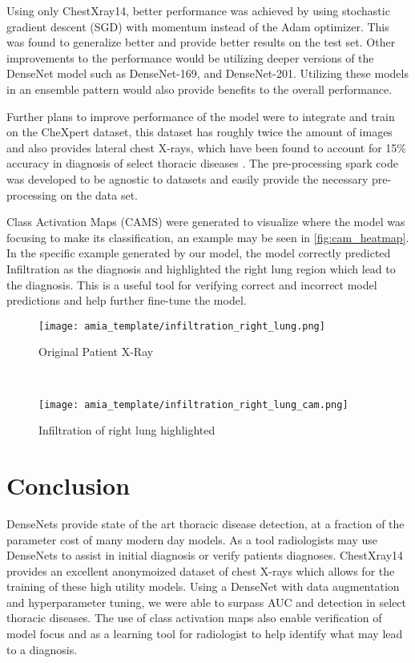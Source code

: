 \documentclass{amia}
\begin{document}
Using only ChestXray14, better performance was achieved by using stochastic gradient descent (SGD) with momentum instead of the Adam optimizer. This was found to generalize better \cite{ref13} and provide better results on the test set. Other improvements to the performance would be utilizing deeper versions of the DenseNet model such as DenseNet-169, and DenseNet-201. Utilizing these models in an ensemble pattern would also provide benefits to the overall performance.

Further plans to improve performance of the model were to integrate and train on the CheXpert dataset, this dataset has roughly twice the amount of images and also provides lateral chest X-rays, which have been found to account for 15\% accuracy in diagnosis of select thoracic diseases \cite{ref2}. The pre-processing spark code was developed to be agnostic to datasets and easily provide the necessary pre-processing on the data set.

Class Activation Maps (CAMS) were generated to visualize where the model was focusing to make its classification, an example may be seen in \ref{fig:cam_heatmap}. In the specific example generated by our model, the model correctly predicted Infiltration as the diagnosis and highlighted the right lung region which lead to the diagnosis. This is a useful tool for verifying correct and incorrect model predictions and help further fine-tune the model.

\begin{figure*}[t!]
    \centering
    \begin{subfigure}[t]{0.5\textwidth}
        \centering
        \texttt{[image: amia\_template/infiltration\_right\_lung.png]}
        \caption{Original Patient X-Ray}
    \end{subfigure}%
    ~
    \begin{subfigure}[t]{0.5\textwidth}
        \centering
        \texttt{[image: amia\_template/infiltration\_right\_lung\_cam.png]}
        \caption{Infiltration of right lung highlighted}
    \end{subfigure}
    \caption{Patient X-Ray \& CAM Heatmap}
\label{fig:cam_heatmap}
\end{figure*}

\section*{Conclusion}
DenseNets provide state of the art thoracic disease detection, at a fraction of the parameter cost of many modern day models. As a tool radiologists may use DenseNets to assist in initial diagnosis or verify patients diagnoses. ChestXray14 provides an excellent anonymoized dataset of chest X-rays which allows for the training of these high utility models. Using a DenseNet with data augmentation and hyperparameter tuning, we were able to surpass AUC and detection in select thoracic diseases. The use of class activation maps also enable verification of model focus and as a learning tool for radiologist to help identify what may lead to a diagnosis.
\end{document}
